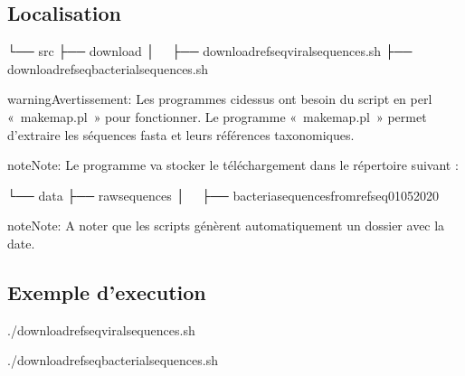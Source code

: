 \documentclass[letterpaper,10pt,french]{sphinxmanual}
\begin{document}
\subsection{Localisation}
\label{\detokenize{download/download_refseq_species_sequences.sh:localisation}}
\begin{sphinxVerbatim}[commandchars=\\\{\}]
└── src
 ├── download
 │   ├── download\PYGZus{}refseq\PYGZus{}viral\PYGZus{}sequences.sh
     ├── download\PYGZus{}refseq\PYGZus{}bacterial\PYGZus{}sequences.sh
\end{sphinxVerbatim}

\begin{sphinxadmonition}{warning}{Avertissement:}
Les programmes ci\sphinxhyphen{}dessus ont besoin du script en perl « makemap.pl » pour fonctionner. Le programme « makemap.pl » permet d’extraire les séquences fasta et leurs références taxonomiques.
\end{sphinxadmonition}

\begin{sphinxadmonition}{note}{Note:}
Le programme va stocker le téléchargement dans le répertoire suivant :
\end{sphinxadmonition}

\begin{sphinxVerbatim}[commandchars=\\\{\}]
└── data
 ├── raw\PYGZus{}sequences
 │   ├── bacteria\PYGZus{}sequences\PYGZus{}from\PYGZus{}refseq\PYGZus{}01\PYGZus{}05\PYGZus{}2020
\end{sphinxVerbatim}

\begin{sphinxadmonition}{note}{Note:}
A noter que les scripts génèrent automatiquement un dossier avec la date.
\end{sphinxadmonition}


\subsection{Exemple d’execution}
\label{\detokenize{download/download_refseq_species_sequences.sh:exemple-d-execution}}
\begin{sphinxVerbatim}[commandchars=\\\{\}]
./download\PYGZus{}refseq\PYGZus{}viral\PYGZus{}sequences.sh
\end{sphinxVerbatim}

\begin{sphinxVerbatim}[commandchars=\\\{\}]
./download\PYGZus{}refseq\PYGZus{}bacterial\PYGZus{}sequences.sh
\end{sphinxVerbatim}
\end{document}
